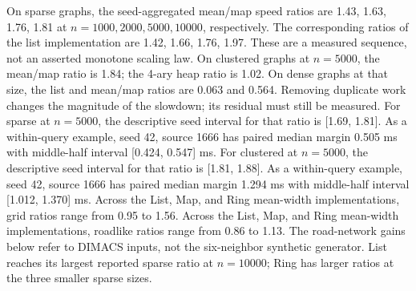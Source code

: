 On sparse graphs, the seed-aggregated mean/map speed ratios are 1.43, 1.63, 1.76, 1.81 at $n=1000,2000,5000,10000$, respectively. The corresponding ratios of the list implementation are 1.42, 1.66, 1.76, 1.97. These are a measured sequence, not an asserted monotone scaling law. On clustered graphs at $n=5000$, the mean/map ratio is 1.84; the 4-ary heap ratio is 1.02. On dense graphs at that size, the list and mean/map ratios are 0.063 and 0.564. Removing duplicate work changes the magnitude of the slowdown; its residual must still be measured.
For sparse at $n=5000$, the descriptive seed interval for that ratio is [1.69, 1.81]. As a within-query example, seed 42, source 1666 has paired median margin 0.505 ms with middle-half interval [0.424, 0.547] ms. For clustered at $n=5000$, the descriptive seed interval for that ratio is [1.81, 1.88]. As a within-query example, seed 42, source 1666 has paired median margin 1.294 ms with middle-half interval [1.012, 1.370] ms. 
Across the List, Map, and Ring mean-width implementations, grid ratios range from 0.95 to 1.56. Across the List, Map, and Ring mean-width implementations, roadlike ratios range from 0.86 to 1.13. The road-network gains below refer to DIMACS inputs, not the six-neighbor synthetic generator. List reaches its largest reported sparse ratio at $n=10000$; Ring has larger ratios at the three smaller sparse sizes.
